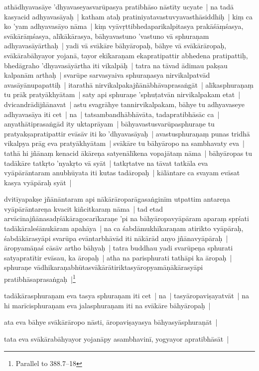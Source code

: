 \documentclass[article,12pt,a4paper]{memoir}
\begin{document}
	  \pstart athādhyavasāye 'dhyavaseyasvarūpasya pratibhāso nāstīty ucyate | na tadā kasyacid adhyavasāyaḥ | katham ataḥ pratiniyatavastuvyavasthāsiddhiḥ | kiṃ ca ko 'yam adhyavasāyo nāma | kiṃ vyāvṛttibhedaparikalpitasya prakāśāṃśasya, svākārāṃśasya, alīkākārasya, bāhyavastuno 'vastuno vā sphuraṇam adhyavasāyārthaḥ | yadi vā svākāre bāhyāropaḥ, bāhye vā svākārāropaḥ, svākārabāhyayor yojanā, tayor ekīkaraṇam ekapratipattir abhedena pratipattiḥ, bhedāgraho 'dhyavasāyārtha iti vikalpāḥ | \label{thakur75-133.28} tatra na tāvad ādimau pakṣau kalpanām arthaḥ | svarūpe sarvasyaiva sphuraṇasya nirvikalpatvād avasāyānupapattiḥ | itarathā nirvikalpakajñānābhāvaprasaṅgāt | \label{thakur75-133.30} alīkasphuraṇaṃ tu prāk pratyākhyātam | saty api sphuraṇe 'sphuṭatvān nirvikalpakam etat | dvicandrādijñānavat | astu svagrāhye tannirvikalpakam, bāhye tu adhyavaseye adhyavasāya iti cet | na | tatsambandhābhāvāta, tadapratibhāsāc ca | anyathātiprasaṅgād ity uktaprāyam | bāhyavastusvarūpasphuraṇe tu pratyakṣapratipattir evāsāv iti ko 'dhyavasāyaḥ | avastusphuraṇaṃ punas tridhā vikalpya prāg eva pratyākhyātam | \label{thakur75-134.4} svākāre tu bāhyāropo na sambhavaty eva | tathā hi jñānaṃ kenacid ākāreṇa satyenālīkena vopajātaṃ nāma | bāhyāropas tu tadākāre tatkṛto 'nyakṛto vā syāt | tatkṛtatve na tāvat tatkāla eva vyāpārāntaram anubhūyata iti kutas tadāropaḥ | kālāntare ca svayam evāsat kasya vyāpāraḥ syāt |
	\pend
      

	  \pstart dvitīyapakṣe jñānāntaram api nākārāroparāgasaṅginīm utpattim antareṇa vyāpārāntareṇa kvacit kiñcitkaraṃ nāma | tad etad arvācīnajñānasadṛśākāragocarīkaraṇe 'pi na bāhyāropavyāpāram aparaṃ spṛśati tadākāraleśānukāram apahāya | na ca śabdāmukhīkaraṇam atirikto vyāpāraḥ, śabdākārasyāpi svarūpa evāntarbhāvād iti nākārād anyo jñānavyāpāraḥ | āropyamāṇaś cāsāv artho bāhyaḥ | tatra buddhau yadi svarūpeṇa sphurati satyapratītir evāsau, ka āropaḥ | atha na parisphurati tathāpi ka āropaḥ | sphuraṇe vādhikaraṇabhūtasvākārātiriktasyāropyamāṇākārasyāpi pratibhāsaprasaṅgaḥ |\footnote{Parallel to 388.7--18}
	\pend
      

	  \pstart tadākārasphuraṇam eva tasya sphuraṇam iti cet | na | tasyāropaviṣayatvāt | na hi marīcisphuraṇam eva jalasphuraṇam iti na svākāre bāhyāropaḥ |
	\pend
      

	  \pstart ata eva bāhye svākārāropo nāsti, āropaviṣayasya bāhyasyāsphuraṇāt |
	\pend
      

	  \pstart tata eva svākārabāhyayor yojanāpy asambhavinī, yogyayor apratibhāsāt |
	\pend
      
\end{document}
